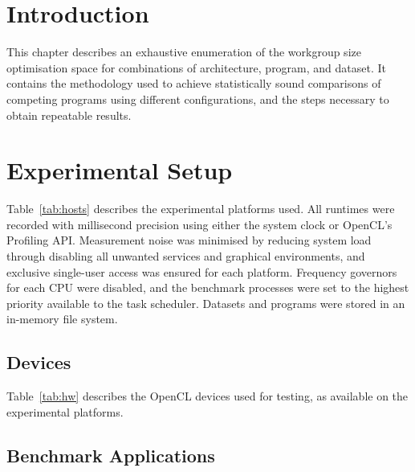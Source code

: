 \section{Introduction}

This chapter describes an exhaustive enumeration of the workgroup size
optimisation space for  combinations of
architecture, program, and dataset. It contains the methodology used
to achieve statistically sound comparisons of competing programs using
different configurations, and the steps necessary to obtain repeatable
results.


\section{Experimental Setup}

\begin{table}

\caption[Specification of experimental platforms]{%
  Specification of experimental platforms.%
}
\label{tab:hosts}
\end{table}

Table~\ref{tab:hosts} describes the experimental platforms used.  All
runtimes were recorded with millisecond precision using either the
system clock or OpenCL's Profiling API. Measurement noise was
minimised by reducing system load through disabling all unwanted
services and graphical environments, and exclusive single-user access
was ensured for each platform. Frequency governors for each CPU were
disabled, and the benchmark processes were set to the highest priority
available to the task scheduler. Datasets and programs were stored in
an in-memory file system.

\subsection{Devices}

\begin{table}

\caption[Specification of experimental OpenCL devices]{%
  Specification of experimental OpenCL devices.%
}
\label{tab:hw}
\end{table}

Table~\ref{tab:hw} describes the OpenCL devices used for testing, as
available on the experimental platforms.

\subsection{Benchmark Applications}

